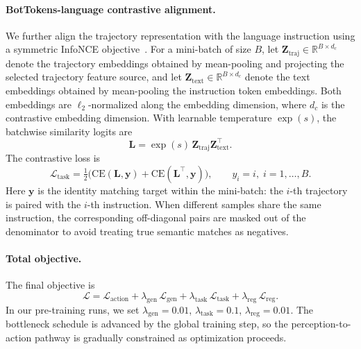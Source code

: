 \documentclass[a4paper,table]{extarticle}
\begin{document}
\paragraph{BotTokens-language contrastive alignment.}
We further align the trajectory representation with the language instruction using a symmetric InfoNCE objective~\cite{infonce_2018,clip_2021,lara_2026}. For a mini-batch of size $B$, let $\mathbf Z_{\mathrm{traj}}\in\mathbb R^{B\times d_c}$ denote the trajectory embeddings obtained by mean-pooling and projecting the selected trajectory feature source, and let $\mathbf Z_{\mathrm{text}}\in\mathbb R^{B\times d_c}$ denote the text embeddings obtained by mean-pooling the instruction token embeddings. Both embeddings are $\ell_2$-normalized along the embedding dimension, where $d_c$ is the contrastive embedding dimension. With learnable temperature $\exp(s)$, the batchwise similarity logits are
\begin{equation}
  \mathbf L = \exp(s)\,\mathbf Z_{\mathrm{traj}}\mathbf Z_{\mathrm{text}}^\top .
\end{equation}
The contrastive loss is
\begin{equation}
  \mathcal{L}_{\mathrm{task}}
  = \tfrac12\big(\mathrm{CE}(\mathbf L,\mathbf y)
                + \mathrm{CE}(\mathbf L^\top,\mathbf y)\big),
  \qquad y_i = i,\; i=1,\ldots,B .
\end{equation}
Here $\mathbf y$ is the identity matching target within the mini-batch: the $i$-th trajectory is paired with the $i$-th instruction. When different samples share the same instruction, the corresponding off-diagonal pairs are masked out of the denominator to avoid treating true semantic matches as negatives.

\paragraph{Total objective.}
The final objective is
\begin{equation}
  \mathcal{L}
  = \mathcal{L}_{\mathrm{action}}
+ \lambda_{\mathrm{gen}}\,\mathcal{L}_{\mathrm{gen}}
+ \lambda_{\mathrm{task}}\,\mathcal{L}_{\mathrm{task}}
+ \lambda_{\mathrm{reg}}\,\mathcal{L}_{\mathrm{reg}} .
\end{equation}
In our pre-training runs, we set
$\lambda_{\mathrm{gen}}=0.01$,
$\lambda_{\mathrm{task}}=0.1$,
$\lambda_{\mathrm{reg}}=0.01$. The bottleneck schedule is advanced by the global training step, so the perception-to-action pathway is gradually constrained as optimization proceeds.
\end{document}
